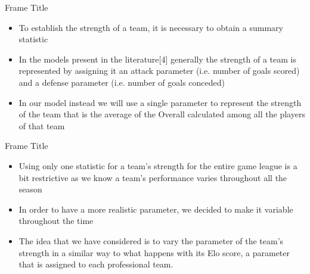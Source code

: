 \documentclass[aspectratio=169,xcolor=dvipsnames]{beamer}
\begin{document}

\begin{frame}{Frame Title}
    \begin{itemize}
        
        \item To establish the strength of a team, it is necessary to obtain a summary statistic
        
        \item In the models present in the literature[4] generally the strength of a team is represented by assigning it an attack parameter (i.e. number of goals scored) and a defense parameter (i.e. number of goals conceded)
        
        \item In our model instead we will use a single parameter to represent the strength of the team that is the average of the Overall calculated among all the players of that team
    \end{itemize}
\end{frame}


\begin{frame}{Frame Title}
    \begin{itemize}
        
        \item Using only one statistic for a team's strength for the entire game league is a bit restrictive as we know a team's performance varies throughout all the season
        
        \item In order to have a more realistic parameter, we decided to make it variable throughout the time
        
        \item The idea that we have considered is to vary the parameter of the team's strength in a similar way to what happens with its Elo score, a parameter that is assigned to each professional team.
    \end{itemize}

\end{frame}

\end{document}

